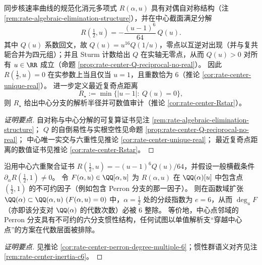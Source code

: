 \begin{conclusion}\label{con:xi-rate-center-sixfold-unique-real-rstar}
同步核速率曲线的规范化消元多项式 \(R(\alpha,u)\) 具有对偶自对称结构（注 \ref{rem:rate-algebraic-elimination-structure}），并在中心截面满足分解
\[
R\!\left(\tfrac12,u\right)=-\frac{(u-1)^6}{64}\,Q(u).
\]
其中 \(Q(u)\) 系数回文，故 \(Q(u)=u^{16}Q(1/u)\)，零点以互逆对出现（并与复共轭合并为四元组）；并且 Sturm 计数给出 \(Q\) 在实轴无零点，从而 \(Q(u)>0\) 对所有 \(u\in\RR\) 成立（命题 \ref{prop:rate-center-Q-reciprocal-no-real}）。
因此 \(R(\tfrac12,u)=0\) 在实参数上当且仅当 \(u=1\)，且重数恰为 \(6\)（推论 \ref{cor:rate-center-unique-real}）。
进一步定义最近复奇点距离
\[
R_\star:=\min\{|u-1|:\ Q(u)=0\},
\]
则 \(R_\star\) 给出中心分支的解析半径并可数值审计（推论 \ref{cor:rate-center-Rstar}）。
\end{conclusion}
\begin{proof}[证明要点]
自对称与中心分解的可复算证书见注 \ref{rem:rate-algebraic-elimination-structure}；
\(Q\) 的自倒易性与实根空性见命题 \ref{prop:rate-center-Q-reciprocal-no-real}；
中心唯一实交与六重性见推论 \ref{cor:rate-center-unique-real}；
最近复奇点距离的数值证书见推论 \ref{cor:rate-center-Rstar}。
\end{proof}

\begin{conclusion}\label{con:xi-rate-center-perron-degree-multiple-6}
沿用中心六重聚合证书 \(R(\tfrac12,u)=-(u-1)^6Q(u)/64\)，并假设一般横截条件 \(\partial_\alpha R(\tfrac12,1)\neq 0\)。
令 \(F(\alpha,u)\in\QQ[\alpha,u]\) 为 \(R(\alpha,u)\) 在 \(\QQ(\alpha)[u]\) 中包含点 \((\tfrac12,1)\) 的不可约因子（例如包含 Perron 分支的那一因子）。
则在函数域扩张 \(\QQ(\alpha)\subset \QQ(\alpha,u)\ (F(\alpha,u)=0)\) 中，\(\alpha=\tfrac12\) 处的分歧指数为 \(e=6\)，从而 \(\deg_uF\)（亦即该分支对 \(\QQ(\alpha)\) 的代数次数）必被 \(6\) 整除。
等价地，中心点邻域的 Perron 分支具有不可约的六分支惯性结构，任何试图以单值解析支“穿越中心点”的方案在代数层面被排除。
\end{conclusion}
\begin{proof}[证明要点]
见推论 \ref{cor:rate-center-perron-degree-multiple-6}；惯性群语义对齐见注 \ref{rem:rate-center-inertia-c6}。
\end{proof}



\endinput
